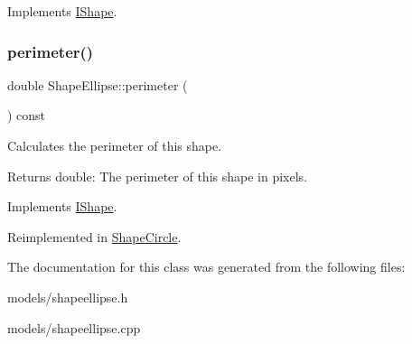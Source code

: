 Implements \mbox{\hyperlink{class_i_shape_a3d23494cd34e658cc6b39a2e2db0b7fe}{I\+Shape}}.

\mbox{\label{class_shape_ellipse_a397c01c912105854e065f6c2d766f73a}} 
\subsubsection{\texorpdfstring{perimeter()}{perimeter()}}
{\footnotesize\ttfamily double Shape\+Ellipse\+::perimeter (\begin{DoxyParamCaption}{ }\end{DoxyParamCaption}) const\hspace{0.3cm}{\ttfamily [virtual]}}



Calculates the perimeter of this shape. 

\begin{DoxyReturn}{Returns}
double\+: The perimeter of this shape in pixels. 
\end{DoxyReturn}


Implements \mbox{\hyperlink{class_i_shape_a485f6770c4e56b31c76d368b959b6f00}{I\+Shape}}.



Reimplemented in \mbox{\hyperlink{class_shape_circle_ad393d13676b0d0fcb36346b9a90b74af}{Shape\+Circle}}.



The documentation for this class was generated from the following files\+:\begin{DoxyCompactItemize}
\item 
models/shapeellipse.\+h\item 
models/shapeellipse.\+cpp\end{DoxyCompactItemize}

